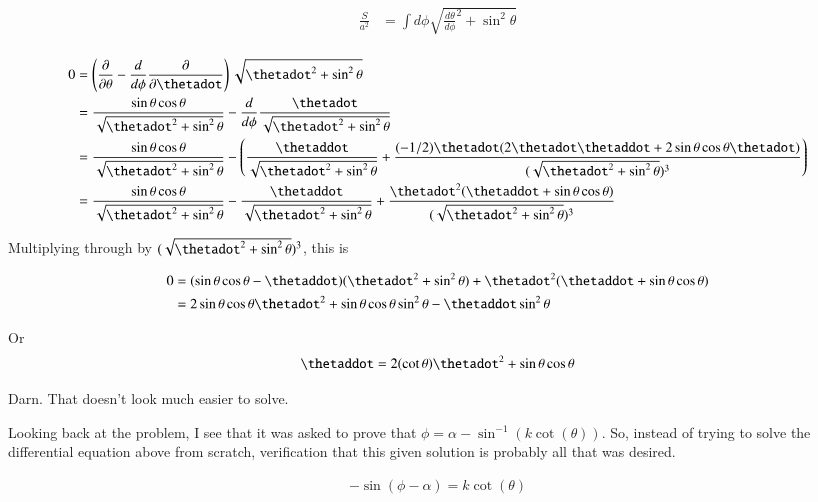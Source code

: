 \begin{align*}
\frac{S}{a^2} &= \int d\phi \sqrt{{\frac{d\theta}{d\phi}}^2 + \sin^2\theta } \\
\end{align*}

\begin{align*}
0 
&= \left( \PD{\theta}{} - \frac{d}{d\phi} \PD{\thetadot}{} \right) \sqrt{\thetadot^2 + \sin^2\theta } \\
&= \frac{\sin\theta \cos\theta}{ \sqrt{\thetadot^2 + \sin^2\theta } } -
\frac{d}{d\phi} \frac{\thetadot} { \sqrt{\thetadot^2 + \sin^2\theta } } \\
&= \frac{\sin\theta \cos\theta}{ \sqrt{\thetadot^2 + \sin^2\theta } } -
\left(
\frac{\thetaddot} { \sqrt{\thetadot^2 + \sin^2\theta } } 
+ \frac{(-1/2)\thetadot(2 \thetadot \thetaddot + 2 \sin\theta\cos\theta \thetadot)} { (\sqrt{\thetadot^2 + \sin^2\theta })^3 } 
\right) \\
&= \frac{\sin\theta \cos\theta}{ \sqrt{\thetadot^2 + \sin^2\theta } } 
- \frac{\thetaddot} { \sqrt{\thetadot^2 + \sin^2\theta } } 
+ \frac{\thetadot^2( \thetaddot + \sin\theta\cos\theta )} { (\sqrt{\thetadot^2 + \sin^2\theta })^3 } 
\\
\end{align*}

Multiplying through by $(\sqrt{\thetadot^2 + \sin^2\theta })^3$, this is

\begin{align*}
0 
&= (\sin\theta \cos\theta - \thetaddot) ( \thetadot^2 + \sin^2\theta ) + \thetadot^2( \thetaddot + \sin\theta\cos\theta )  \\
&= 
2 \sin\theta \cos\theta \thetadot^2 
+ \sin\theta \cos\theta \sin^2\theta 
- \thetaddot \sin^2\theta  
\\
\end{align*}

Or
\begin{align*}
\thetaddot =
2 (\cot\theta) \thetadot^2 
+ \sin\theta \cos\theta 
\end{align*}

Darn.  That doesn't look much easier to solve.

Looking back at the problem, I see that it was asked to prove that $\phi = \alpha - \sin^{-1}(k\cot(\theta))$.  So, instead of trying to solve
the differential equation above from scratch, verification that this given solution is probably all that was desired.

\begin{align*}
-\sin(\phi - \alpha) = k\cot(\theta)
\end{align*}


